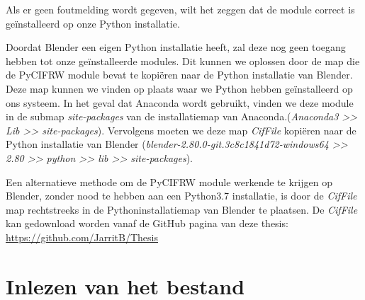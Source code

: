 Als er geen foutmelding wordt gegeven, wilt het zeggen dat de module correct is geïnstalleerd op onze Python installatie. 
\par
Doordat Blender een eigen Python installatie heeft, zal deze nog geen toegang hebben tot onze geïnstalleerde modules. Dit kunnen we oplossen door de map die de PyCIFRW module bevat te kopiëren naar de Python installatie van Blender. Deze map kunnen we vinden op plaats waar we Python hebben geïnstalleerd op ons systeem. In het geval dat Anaconda wordt gebruikt, vinden we deze module in de submap \textit{site-packages} van de installatiemap van Anaconda.(\textit{Anaconda3 \textgreater \textgreater{} Lib \textgreater \textgreater{} site-packages}).
Vervolgens moeten we deze map \textit{CifFile} kopiëren naar de Python installatie van Blender (\textit{blender-2.80.0-git.3c8c1841d72-windows64 \textgreater \textgreater{} 2.80 \textgreater \textgreater{} python \textgreater \textgreater{} lib \textgreater \textgreater{} site-packages}). 
\par
Een alternatieve methode om de PyCIFRW module werkende te krijgen op Blender, zonder nood te hebben aan een Python3.7 installatie, is door de \textit{CifFile} map rechtstreeks in de Pythoninstallatiemap van Blender te plaatsen. De \textit{CifFile} kan gedownload worden vanaf de GitHub pagina van deze thesis: \url{https://github.com/JarritB/Thesis}
  
\section{Inlezen van het bestand}

